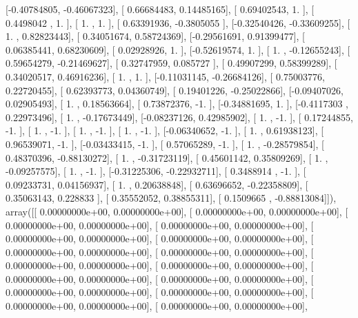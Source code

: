 \documentclass{article}
\begin{document}
       [-0.40784805, -0.46067323],
       [ 0.66684483,  0.14485165],
       [ 0.69402543,  1.        ],
       [ 0.4498042 ,  1.        ],
       [ 1.        ,  1.        ],
       [ 0.63391936, -0.3805055 ],
       [-0.32540426, -0.33609255],
       [ 1.        ,  0.82823443],
       [ 0.34051674,  0.58724369],
       [-0.29561691,  0.91399477],
       [ 0.06385441,  0.68230609],
       [ 0.02928926,  1.        ],
       [-0.52619574,  1.        ],
       [ 1.        , -0.12655243],
       [ 0.59654279, -0.21469627],
       [ 0.32747959,  0.085727  ],
       [ 0.49907299,  0.58399289],
       [ 0.34020517,  0.46916236],
       [ 1.        ,  1.        ],
       [-0.11031145, -0.26684126],
       [ 0.75003776,  0.22720455],
       [ 0.62393773,  0.04360749],
       [ 0.19401226, -0.25022866],
       [-0.09407026,  0.02905493],
       [ 1.        ,  0.18563664],
       [ 0.73872376, -1.        ],
       [-0.34881695,  1.        ],
       [-0.4117303 ,  0.22973496],
       [ 1.        , -0.17673449],
       [-0.08237126,  0.42985902],
       [ 1.        , -1.        ],
       [ 0.17244855, -1.        ],
       [ 1.        , -1.        ],
       [ 1.        , -1.        ],
       [ 1.        , -1.        ],
       [-0.06340652, -1.        ],
       [ 1.        ,  0.61938123],
       [ 0.96539071, -1.        ],
       [-0.03433415, -1.        ],
       [ 0.57065289, -1.        ],
       [ 1.        , -0.28579854],
       [ 0.48370396, -0.88130272],
       [ 1.        , -0.31723119],
       [ 0.45601142,  0.35809269],
       [ 1.        , -0.09257575],
       [ 1.        , -1.        ],
       [-0.31225306, -0.22932711],
       [ 0.3488914 , -1.        ],
       [ 0.09233731,  0.04156937],
       [ 1.        ,  0.20638848],
       [ 0.63696652, -0.22358809],
       [ 0.35063143,  0.228833  ],
       [ 0.35552052,  0.38855311],
       [ 0.1509665 , -0.88813084]]), array([[  0.00000000e+00,   0.00000000e+00],
       [  0.00000000e+00,   0.00000000e+00],
       [  0.00000000e+00,   0.00000000e+00],
       [  0.00000000e+00,   0.00000000e+00],
       [  0.00000000e+00,   0.00000000e+00],
       [  0.00000000e+00,   0.00000000e+00],
       [  0.00000000e+00,   0.00000000e+00],
       [  0.00000000e+00,   0.00000000e+00],
       [  0.00000000e+00,   0.00000000e+00],
       [  0.00000000e+00,   0.00000000e+00],
       [  0.00000000e+00,   0.00000000e+00],
       [  0.00000000e+00,   0.00000000e+00],
       [  0.00000000e+00,   0.00000000e+00],
       [  0.00000000e+00,   0.00000000e+00],
       [  0.00000000e+00,   0.00000000e+00],
       [  0.00000000e+00,   0.00000000e+00],
\end{document}
